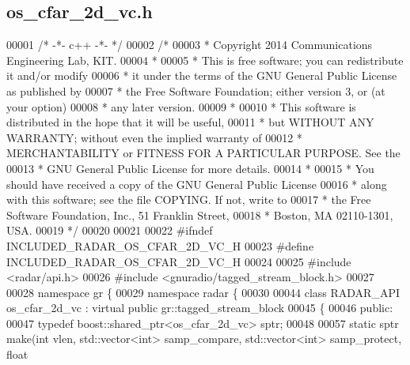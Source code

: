 \subsection{os\+\_\+cfar\+\_\+2d\+\_\+vc.\+h}
\label{os__cfar__2d__vc_8h_source}

\begin{DoxyCode}
00001 \textcolor{comment}{/* -*- c++ -*- */}
00002 \textcolor{comment}{/* }
00003 \textcolor{comment}{ * Copyright 2014 Communications Engineering Lab, KIT.}
00004 \textcolor{comment}{ * }
00005 \textcolor{comment}{ * This is free software; you can redistribute it and/or modify}
00006 \textcolor{comment}{ * it under the terms of the GNU General Public License as published by}
00007 \textcolor{comment}{ * the Free Software Foundation; either version 3, or (at your option)}
00008 \textcolor{comment}{ * any later version.}
00009 \textcolor{comment}{ * }
00010 \textcolor{comment}{ * This software is distributed in the hope that it will be useful,}
00011 \textcolor{comment}{ * but WITHOUT ANY WARRANTY; without even the implied warranty of}
00012 \textcolor{comment}{ * MERCHANTABILITY or FITNESS FOR A PARTICULAR PURPOSE.  See the}
00013 \textcolor{comment}{ * GNU General Public License for more details.}
00014 \textcolor{comment}{ * }
00015 \textcolor{comment}{ * You should have received a copy of the GNU General Public License}
00016 \textcolor{comment}{ * along with this software; see the file COPYING.  If not, write to}
00017 \textcolor{comment}{ * the Free Software Foundation, Inc., 51 Franklin Street,}
00018 \textcolor{comment}{ * Boston, MA 02110-1301, USA.}
00019 \textcolor{comment}{ */}
00020 
00021 
00022 \textcolor{preprocessor}{#ifndef INCLUDED\_RADAR\_OS\_CFAR\_2D\_VC\_H}
00023 \textcolor{preprocessor}{#define INCLUDED\_RADAR\_OS\_CFAR\_2D\_VC\_H}
00024 
00025 \textcolor{preprocessor}{#include <radar/api.h>}
00026 \textcolor{preprocessor}{#include <gnuradio/tagged\_stream\_block.h>}
00027 
00028 \textcolor{keyword}{namespace }gr \{
00029   \textcolor{keyword}{namespace }radar \{
00030 
00044     \textcolor{keyword}{class }RADAR_API os_cfar_2d_vc : \textcolor{keyword}{virtual} \textcolor{keyword}{public} gr::tagged\_stream\_block
00045     \{
00046      \textcolor{keyword}{public}:
00047       \textcolor{keyword}{typedef} boost::shared\_ptr<os\_cfar\_2d\_vc> sptr;
00048 
00057       \textcolor{keyword}{static} sptr make(\textcolor{keywordtype}{int} vlen, std::vector<int> samp\_compare, std::vector<int> samp\_protect, \textcolor{keywordtype}{float} 

\end{DoxyCode}
